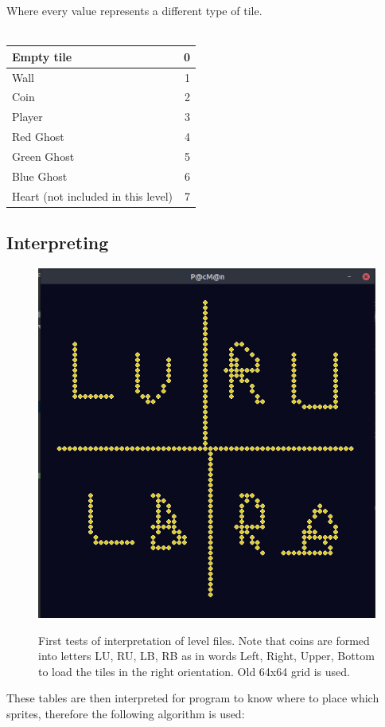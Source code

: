 \documentclass[11pt,a4paper,notitlepage]{report}
\newcommand{\dsubsection}[1]{\FloatBarrier \subsection{#1}}
\newenvironment{img}{
	\begin{center}
		\begin{figure}[H]
			\begin{center}
			
}{
	\end{center}
		\end{figure}
			\end{center}
}
\begin{document}
				\newpage
				Where every value represents a different type of tile.\\ \\
				\begin{tabular}{| l | r |}
					\hline 
					Empty tile & 0 \\ \hline
					Wall & 1 \\ \hline
					Coin & 2 \\ \hline
					Player & 3 \\ \hline
					Red Ghost & 4 \\ \hline
					Green Ghost & 5 \\ \hline
					Blue Ghost & 6 \\ \hline
					Heart (not included in this level) & 7 \\
					\hline
				\end{tabular}
			\dsubsection{Interpreting}
				\begin{img}
					\includegraphics[width=350pt]{images/aligning-level}\\
					\caption{First tests of interpretation of level files. Note that coins are formed into letters LU, RU, LB, RB as in words Left, Right, Upper, Bottom to load the tiles in the right orientation. Old 64x64 grid is used.}
				\end{img}
				These tables are then interpreted for program to know where to place which sprites, therefore the following algorithm is used:\\
\end{document}
